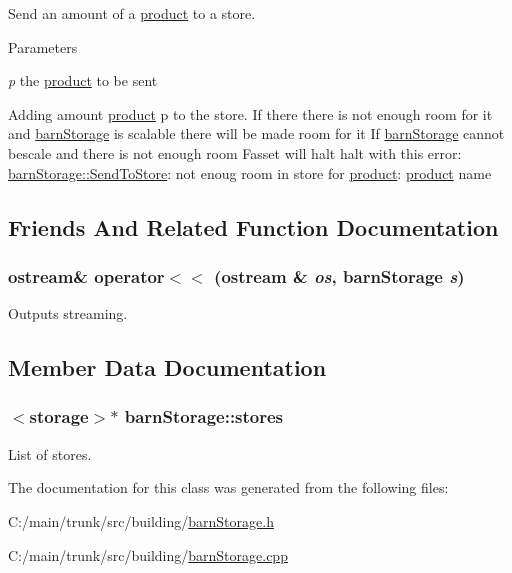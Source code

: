 Send an amount of a \hyperlink{classproduct}{product} to a store. 
\begin{DoxyParams}{Parameters}
\item[{\em p}]the \hyperlink{classproduct}{product} to be sent\end{DoxyParams}
Adding amount \hyperlink{classproduct}{product} p to the store. If there there is not enough room for it and \hyperlink{classbarn_storage}{barnStorage} is scalable there will be made room for it If \hyperlink{classbarn_storage}{barnStorage} cannot bescale and there is not enough room Fasset will halt halt with this error: \hyperlink{classbarn_storage_af10d75ac33adcdd0f6ebe63d25b9d2b3}{barnStorage::SendToStore}: not enoug room in store for \hyperlink{classproduct}{product}: \hyperlink{classproduct}{product} name 

\subsection{Friends And Related Function Documentation}
\hypertarget{classbarn_storage_a9ff04c29ec440b29edf27d2f31c8bcea}{
\subsubsection[{operator$<$$<$}]{\setlength{\rightskip}{0pt plus 5cm}ostream\& operator$<$$<$ (ostream \& {\em os}, \/  {\bf barnStorage} {\em s})}}
\label{classbarn_storage_a9ff04c29ec440b29edf27d2f31c8bcea}


Outputs streaming. 

\subsection{Member Data Documentation}
\hypertarget{classbarn_storage_aaa021946ef9b068d958da554fe693709}{
\subsubsection[{stores}]{$<${\bf storage}$>$$\ast$ {\bf barnStorage::stores}}}
\label{classbarn_storage_aaa021946ef9b068d958da554fe693709}


List of stores. 

The documentation for this class was generated from the following files:\begin{DoxyCompactItemize}
\item 
C:/main/trunk/src/building/\hyperlink{barn_storage_8h}{barnStorage.h}\item 
C:/main/trunk/src/building/\hyperlink{barn_storage_8cpp}{barnStorage.cpp}\end{DoxyCompactItemize}
